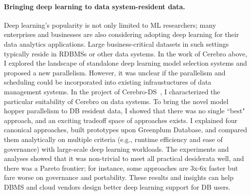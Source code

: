 \documentclass[letterpaper]{article}
\begin{document}
\paragraph{Bringing deep learning to data system-resident data.}
Deep learning's popularity is not only limited to ML researchers; many enterprises and businesses are also considering adopting deep learning for their data analytics applications. Large business-critical
datasets in such settings typically reside in RDBMSs or other data
systems.  In the work of Cerebro above, I explored the landscape of standalone deep learning model selection systems and proposed a new parallelism. However, it was unclear if the parallelism and scheduling could be incorporated into existing infraustuctures of data management systems. In the project of Cerebro-DS~\cite{cerebro-ds}, I characterized the particular suitability of Cerebro on data systems. To bring the novel model hopper parallelism to DB resident data, I showed that there was no single ``best" approach, and
an exciting tradeoff space of approaches exists. I explained four
canonical approaches, built prototypes upon Greenplum Database, and compared them analytically on multiple criteria (e.g., runtime
efficiency and ease of governance) with large-scale deep learning workloads. The experiments and analyses showed
that it was non-trivial to meet all practical desiderata well, and there was
a Pareto frontier; for instance, some approaches are 3x-6x faster but
fare worse on governance and portability. These results and insights
can help DBMS and cloud vendors design better deep learning support for DB
users.
\end{document}
